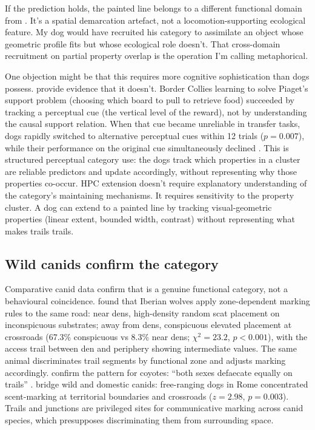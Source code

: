 \documentclass[12pt]{article}
\begin{document}
If the prediction holds, the painted line belongs to a different functional domain from . It's a spatial demarcation artefact, not a locomotion-supporting ecological feature. My dog would have recruited his  category to assimilate an object whose geometric profile fits but whose ecological role doesn't. That cross-domain recruitment on partial property overlap is the operation I'm calling metaphorical.

One objection might be that this requires more cognitive sophistication than dogs possess. \textcite{muller2014} provide evidence that it doesn't. Border Collies learning to solve Piaget's support problem (choosing which board to pull to retrieve food) succeeded by tracking a perceptual cue (the vertical level of the reward), not by understanding the causal support relation. When that cue became unreliable in transfer tasks, dogs rapidly switched to alternative perceptual cues within 12 trials ($p = 0.007$), while their performance on the original cue simultaneously declined \citep[1077]{muller2014}. This is structured perceptual category use: the dogs track which properties in a cluster are reliable predictors and update accordingly, without representing why those properties co-occur. HPC extension doesn't require explanatory understanding of the category's maintaining mechanisms. It requires sensitivity to the property cluster. A dog can extend  to a painted line by tracking visual-geometric properties (linear extent, bounded width, contrast) without representing what makes trails trails.

\subsection{Wild canids confirm the category}

Comparative canid data confirm that  is a genuine functional category, not a behavioural coincidence. \textcite{barja2005} found that Iberian wolves apply zone-dependent marking rules to the same road: near dens, high-density random scat placement on inconspicuous substrates; away from dens, conspicuous elevated placement at crossroads (67.3\% conspicuous vs 8.3\% near dens; $\chi^2 = 23.2$, $p < 0.001$), with the access trail between den and periphery showing intermediate values. The same animal discriminates trail segments by functional zone and adjusts marking accordingly. \textcite{kohn1999} confirm the pattern for coyotes: \enquote{both sexes defaecate equally on trails} \citep[660]{kohn1999}. \textcite{cafazzo2012} bridge wild and domestic canids: free-ranging dogs in Rome concentrated scent-marking at territorial boundaries and crossroads ($z = 2.98$, $p = 0.003$). Trails and junctions are privileged sites for communicative marking across canid species, which presupposes discriminating them from surrounding space.
\end{document}
